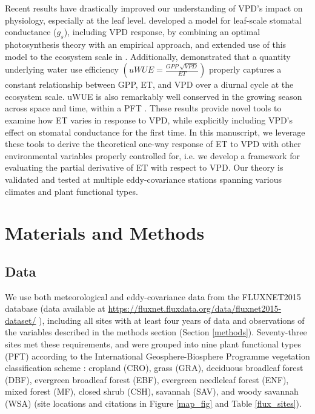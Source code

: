 Recent results have drastically improved our understanding of VPD's
impact on physiology, especially at the leaf
level. \citet{MEDLYN_2011} developed a model for leaf-scale stomatal
conductance ($g_s$), including VPD response, by combining an optimal
photosynthesis theory \citep{Cowan_1977} with an
empirical approach, and extended use of this model to the ecosystem
scale in \citet{Medlyn_2017}. Additionally, \citet{Zhou_2014}
demonstrated that a quantity underlying water use efficiency
$\left(uWUE = \frac{GPP\; \sqrt{VPD}}{ET}\right)$ properly captures a
constant relationship between GPP, ET, and VPD over a diurnal cycle at
the ecosystem scale. uWUE is also remarkably well conserved in the
growing season across space and time, within a PFT
\citep{Zhou_2015}. These results provide novel tools to examine how ET
varies in response to VPD, while explicitly including VPD's effect on
stomatal conductance for the first time. In this manuscript, we
leverage these tools to derive the theoretical one-way response of ET
to VPD with other environmental variables properly controlled for,
i.e. we develop a framework for evaluating the partial derivative of
ET with respect to VPD. Our theory is validated and tested at multiple
eddy-covariance stations spanning various climates and plant
functional types.

\section{Materials and Methods}
\subsection{Data}
\label{data}
We use both meteorological and eddy-covariance data from the
FLUXNET2015 database (data available at \sloppy
\url{https://fluxnet.fluxdata.org/data/fluxnet2015-dataset/} \sloppy),
including all sites with at least four years of data and observations
of the variables described in the methods section (Section
\ref{methods}). Seventy-three sites met these requirements, and were
grouped into nine plant functional types (PFT) according to the
International Geosphere-Biosphere Programme vegetation classification
scheme \citep{Loveland_1999}: cropland (CRO), grass (GRA), deciduous
broadleaf forest (DBF), evergreen broadleaf forest (EBF), evergreen
needleleaf forest (ENF), mixed forest (MF), closed shrub (CSH),
savannah (SAV), and woody savannah (WSA) (site locations and citations in Figure
\ref{map_fig} and Table \ref{flux_sites}).

